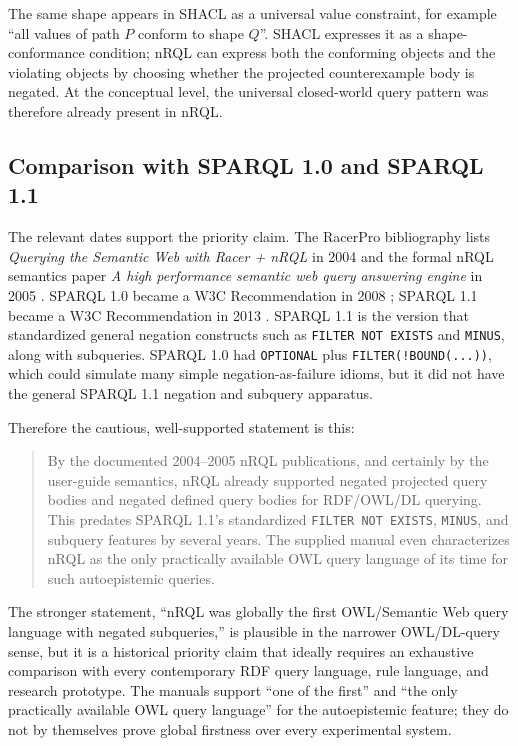 \documentclass[11pt,letterpaper]{article}
\newcommand{\nrql}{nRQL}
\newcommand{\shacl}{SHACL}
\newcommand{\owl}{OWL}
\begin{document}
The same shape appears in \shacl{} as a universal value constraint, for example ``all values of path $P$ conform to shape $Q$''. \shacl{} expresses it as a shape-conformance condition; \nrql{} can express both the conforming objects and the violating objects by choosing whether the projected counterexample body is negated. At the conceptual level, the universal closed-world query pattern was therefore already present in \nrql{}.

\subsection{Comparison with SPARQL 1.0 and SPARQL 1.1}

The relevant dates support the priority claim. The RacerPro bibliography lists \emph{Querying the Semantic Web with Racer + nRQL} in 2004 and the formal \nrql{} semantics paper \emph{A high performance semantic web query answering engine} in 2005 \cite[p.~213,215]{racerug}. SPARQL 1.0 became a W3C Recommendation in 2008 \cite{sparql10}; SPARQL 1.1 became a W3C Recommendation in 2013 \cite{sparql}. SPARQL 1.1 is the version that standardized general negation constructs such as \texttt{FILTER NOT EXISTS} and \texttt{MINUS}, along with subqueries. SPARQL 1.0 had \texttt{OPTIONAL} plus \texttt{FILTER(!BOUND(...))}, which could simulate many simple negation-as-failure idioms, but it did not have the general SPARQL 1.1 negation and subquery apparatus.

Therefore the cautious, well-supported statement is this:

\begin{quote}
By the documented 2004--2005 \nrql{} publications, and certainly by the user-guide semantics, \nrql{} already supported negated projected query bodies and negated defined query bodies for RDF/OWL/DL querying. This predates SPARQL 1.1's standardized \texttt{FILTER NOT EXISTS}, \texttt{MINUS}, and subquery features by several years. The supplied manual even characterizes \nrql{} as the only practically available \owl{} query language of its time for such autoepistemic queries.
\end{quote}

The stronger statement, ``\nrql{} was globally the first OWL/Semantic Web query language with negated subqueries,'' is plausible in the narrower \owl{}/DL-query sense, but it is a historical priority claim that ideally requires an exhaustive comparison with every contemporary RDF query language, rule language, and research prototype. The manuals support ``one of the first'' and ``the only practically available OWL query language'' for the autoepistemic feature; they do not by themselves prove global firstness over every experimental system.
\end{document}
